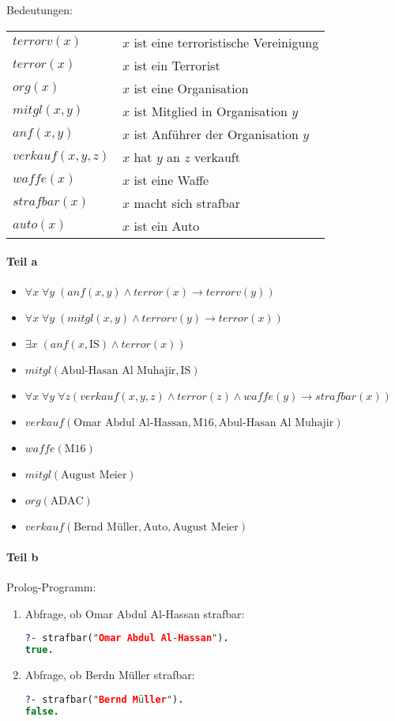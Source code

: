 Bedeutungen:\\
\begin{tabular}{l l}
$terrorv(x)$ & $x$ ist eine terroristische Vereinigung\\
$terror(x)$ & $x$ ist ein Terrorist\\
$org(x)$ & $x$ ist eine Organisation\\
$mitgl(x,y)$ & $x$ ist Mitglied in Organisation $y$\\
$anf(x,y)$ & $x$ ist Anführer der Organisation $y$\\
$verkauf(x,y,z)$ & $x$ hat $y$ an $z$ verkauft\\
$waffe(x)$ & $x$ ist eine Waffe\\
$strafbar(x)$ & $x$ macht sich strafbar\\
$auto(x)$ & $x$ ist ein Auto
\end{tabular}
\paragraph*{Teil a}
\begin{itemize}
\item $\forall x\; \forall y\;(anf(x,y) \wedge terror(x) \to terrorv(y) )$
\item $\forall x\;\forall y\; (mitgl(x,y) \wedge terrorv(y) \to terror(x))$
\item $\exists x\; (anf(x,\text{IS}) \wedge terror(x))$
\item $mitgl(\text{Abul-Hasan Al Muhajir},\text{IS})$
\item $\forall x\; \forall y\; \forall z ( verkauf(x,y,z) \wedge terror(z) \wedge waffe(y) \to strafbar(x))$
\item $verkauf(\text{Omar Abdul Al-Hassan},\text{M16},\text{Abul-Hasan Al Muhajir})$
\item $waffe(\text{M16})$
\item $mitgl(\text{August Meier})$
\item $org(\text{ADAC})$
\item $verkauf(\text{Bernd Müller}, \text{Auto},\text{August Meier})$
\end{itemize}

\paragraph*{Teil b}
Prolog-Programm:

\begin{enumerate}[label=(\roman*)]
\item Abfrage, ob Omar Abdul Al-Hassan strafbar:
\begin{lstlisting}[language=Prolog]
?- strafbar("Omar Abdul Al-Hassan").
true.
\end{lstlisting}
\item Abfrage, ob Berdn Müller strafbar:
\begin{lstlisting}[language=Prolog]
?- strafbar("Bernd Müller").
false.
\end{lstlisting}
\end{enumerate}
